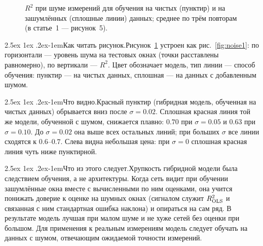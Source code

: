 \documentclass[12pt,a4paper]{report}
\makeatletter
\renewcommand\paragraph{\@startsection{paragraph}{4}{\z@}%
  {2.5ex \@plus1ex \@minus.2ex}{-1em}{\normalfont\normalsize\bfseries}}
\numberwithin{equation}{chapter}
\newcommand{\figread}{\paragraph{Как читать рисунок.}}
\newcommand{\figsee}{\paragraph{Что видно.}}
\newcommand{\figgen}{\paragraph{Что из этого следует.}}
\makeatother
\begin{document}
\begin{figure}[h]
\centering
{}
\caption{$R^2$ при шуме измерений для обучения на чистых (пунктир) и на
зашумлённых (сплошные линии) данных; среднее по трём повторам (в статье~1
--- рисунок~5).}
\label{fig:r16}
\end{figure}

\figread Рисунок~\ref{fig:r16} устроен как рис.~\ref{fig:noise1}: по горизонтали --- уровень шума на
тестовых окнах (точки расставлены равномерно), по вертикали --- $R^2$. Цвет
обозначает модель, тип линии --- способ обучения: пунктир --- на чистых
данных, сплошная --- на данных с добавленным шумом.

\figsee Красный пунктир (гибридная модель, обученная на чистых данных)
обрывается вниз после $\sigma=0.02$. Сплошная красная линия той же модели,
обученной с шумом, снижается плавно: $0.70$ при $\sigma=0.05$ и $0.63$ при
$\sigma=0.10$. До $\sigma=0.02$ она выше всех остальных линий; при больших
$\sigma$ все линии сходятся к $0.6$--$0.7$. Слева видна небольшая цена:
при $\sigma=0$ сплошная красная линия чуть ниже пунктирной.

\figgen Хрупкость гибридной модели была следствием обучения, а не
архитектуры. Когда сеть видит при обучении зашумлённые окна вместе с
вычисленными по ним оценками, она учится понижать доверие к оценке на
шумных окнах (сигналом служит $R^2_{\rm OLS}$ и связанная с ним стандартная
ошибка наклона) и опираться на сам ряд. В результате модель лучшая при
малом шуме и не хуже сетей без оценки при большом. Для применения к
реальным измерениям модель следует обучать на данных с шумом, отвечающим
ожидаемой точности измерений.
\end{document}
